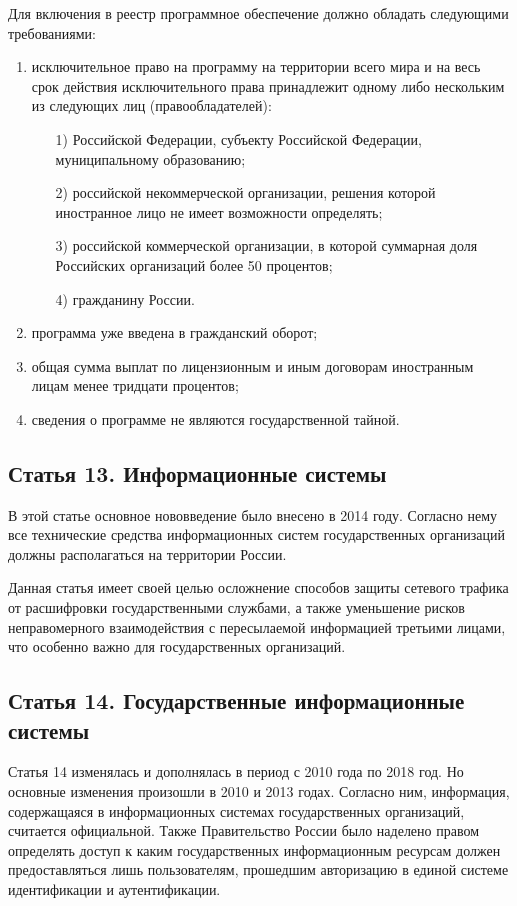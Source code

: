 Для включения в реестр программное обеспечение должно обладать следующими требованиями:

\begin{enumerate}
	\item исключительное право на программу на территории всего мира и на весь срок действия исключительного права принадлежит одному либо нескольким из следующих лиц (правообладателей):
	\begin{enumerate}
		\item[1)] Российской Федерации, субъекту Российской Федерации, муниципальному образованию;
		\item[2)] российской некоммерческой организации, решения которой иностранное лицо не имеет возможности определять;
		\item[3)] российской коммерческой организации, в которой суммарная доля Российских организаций более 50 процентов;
		\item[4)] гражданину России.
	\end{enumerate}
	\item программа уже введена в гражданский оборот;
	\item общая сумма выплат по лицензионным и иным договорам иностранным лицам менее тридцати процентов;
	\item сведения о программе не являются государственной тайной.
\end{enumerate}

\subsection{Статья 13. Информационные системы}

В этой статье основное нововведение было внесено в 2014 году. Согласно нему все технические средства информационных систем государственных организаций должны располагаться на территории России.


Данная статья имеет своей целью осложнение способов защиты сетевого трафика от расшифровки государственными службами, а также уменьшение рисков неправомерного взаимодействия с пересылаемой информацией третьими лицами, что особенно важно для государственных организаций.

\subsection{Статья 14. Государственные информационные системы}

Статья 14 изменялась и дополнялась в период с 2010 года по 2018 год. Но основные изменения произошли в 2010 и 2013 годах. Согласно ним, информация, содержащаяся в информационных системах государственных организаций, считается официальной. Также Правительство России было наделено правом определять доступ к каким государственных информационным ресурсам должен предоставляться лишь пользователям, прошедшим авторизацию в единой системе идентификации и аутентификации.

